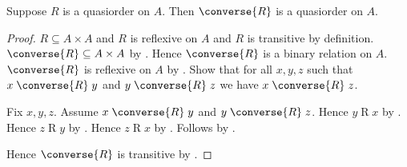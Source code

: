 \begin{proposition}\label{converse_quasiorder_on}
    Suppose $R$ is a quasiorder on $A$.
    Then $\converse{R}$ is a quasiorder on $A$.
\end{proposition}
\begin{proof}
    $R\subseteq A\times A$ and $R$ is reflexive on $A$ and
        $R$ is transitive by definition.
    $\converse{R}\subseteq A\times A$ by .
    Hence $\converse{R}$ is a binary relation on $A$.
    $\converse{R}$ is reflexive on $A$ by
        .
    Show that for all $x,y,z$ such that
        $x\mathrel{\converse{R}}y$ and
        $y\mathrel{\converse{R}}z$ we have
        $x\mathrel{\converse{R}}z$.
    \begin{subproof}
        Fix $x,y,z$.
        Assume $x\mathrel{\converse{R}}y$ and
            $y\mathrel{\converse{R}}z$.
        Hence $y\mathrel{R}x$ by .
        Hence $z\mathrel{R}y$ by .
        Hence $z\mathrel{R}x$ by .
        Follows by .
    \end{subproof}
    Hence $\converse{R}$ is transitive by .
\end{proof}
